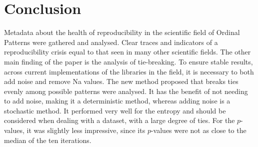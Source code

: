 \chapter{Conclusion}
Metadata about the health of reproducibility in the scientific field of Ordinal Patterns were gathered and analysed. Clear traces and indicators of a reproducibility crisis equal to that seen in many other scientific fields. The other main finding of the paper is the analysis of tie-breaking. To ensure stable results, across current implementations of the libraries in the field, it is necessary to both add noise and remove Na values. The new method proposed that breaks ties evenly among possible patterns were analysed. It has the benefit of not needing to add noise, making it a deterministic method, whereas adding noise is a stochastic method. It performed very well for the entropy and should be considered when dealing with a dataset, with a large degree of ties. For the $p$-values, it was slightly less impressive, since its $p$-values were not as close to the median of the ten iterations. 